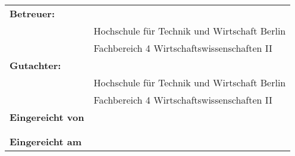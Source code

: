 \begin{center}
	\begin{tabular}{p{5cm}p{10cm}}
		\rule{0mm}{8ex}\textbf{Betreuer:} & \firstSupervisor  \\ 
		& Hochschule für Technik und Wirtschaft Berlin\\ 
		&Fachbereich 4 Wirtschaftswissenschaften II\\
		\rule{0mm}{8ex}\textbf{Gutachter:} & \secondSupervisor  \\ 
		& Hochschule für Technik und Wirtschaft Berlin\\ & Fachbereich 4 Wirtschaftswissenschaften II\\
		
		\rule{0mm}{8ex}\textbf{Eingereicht von} & \studentName  \\ & \studentMail \\ & \studentMatrNr \\
		\rule{0mm}{5ex}\textbf{Eingereicht am } & \dueDate  \\
		
	\end{tabular}
\end{center}

\pagebreak